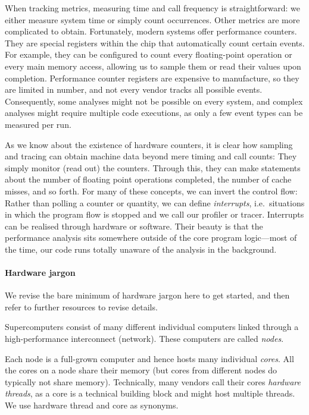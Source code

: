 When tracking metrics, measuring time and call frequency is straightforward:
we either measure system time or simply count occurrences. 
Other metrics are more complicated to obtain. 
Fortunately, modern systems offer performance counters.
They are special registers within the chip that automatically count certain
events.
For example, they can be configured to count every floating-point operation or every main memory access, allowing us to sample them or read their values upon completion. 
Performance counter registers are expensive to manufacture, so they are limited in number, and not every vendor tracks all possible events. 
Consequently, some analyses might not be possible on every system, and complex analyses might require multiple code executions, as only a few event types can be measured per run.


As we know about the existence of hardware counters, it is clear how sampling and tracing can obtain machine data beyond mere timing and call counts:
They simply monitor (read out) the counters.
Through this, they can make statements about the number of floating point operations completed, the number of cache misses, and so forth.
For many of these concepts, we can invert the control flow:
Rather than polling a counter or quantity, we can define \emph{interrupts}, i.e.~situations in which the program flow is stopped and we call our profiler or tracer.
Interrupts can be realised through hardware or software.
Their beauty is that the performance analysis sits somewhere outside of the core program logic---most of the time, our code runs totally unaware of the analysis in the background.




\paragraph{Hardware jargon}

We revise the bare minimum of hardware jargon here to get started, and then
refer to further resources to revise details.


Supercomputers consist of many different individual computers linked through a
high-performance interconnect (network).
These computers are called \emph{nodes}.


Each node is a full-grown computer and hence hosts many individual \emph{cores}.
All the cores on a node share their memory (but cores from different nodes do
typically not share memory).
Technically, many vendors call their cores \emph{hardware threads}, as a core
is a technical building block and might host multiple threads. 
We use hardware thread and core as synonyms.


